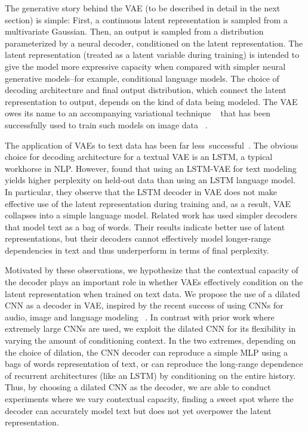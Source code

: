\documentclass{article}
\begin{document}
The generative story behind the VAE (to be described in detail in the next section)
is simple: First, a continuous latent representation is sampled from a multivariate Gaussian. Then, an output is sampled from a distribution parameterized by a neural decoder, conditioned on the
latent representation. The latent representation (treated as a latent variable during training) is intended to give the model more expressive capacity when compared with simpler
neural generative models--for example, conditional language models. The choice of decoding architecture and final output distribution, which connect the latent representation to output, depends on the kind of data being modeled. The VAE owes its name to an accompanying variational technique ~\cite{kingma2013auto} that has been successfully used to train such models on image data ~\cite{gregor2015draw,salimans2015markov,yan2016attribute2image}.


The application of VAEs to text data has been far less\ successful~\cite{bowman2015generating,miao2016neural}. The obvious choice for decoding architecture for a textual VAE is an LSTM, a typical workhorse in NLP. However, \citet{bowman2015generating} found that using an LSTM-VAE for text modeling yields higher perplexity on held-out data than using an LSTM language model. In particular, they observe that the LSTM decoder in VAE does not make effective use of the latent representation during training and, as a result, VAE collapses into a simple language model.
Related work \citep{miao2016neural,larochelle2012neural,mnih2014neural} has used simpler decoders that model text as a bag of words. Their results indicate better use of latent representations, but their decoders cannot effectively model longer-range dependencies in text and thus underperform in terms of final perplexity.

Motivated by these observations, we hypothesize that the contextual capacity of the decoder plays an important role in whether VAEs effectively condition on the latent representation when trained on text data. We propose the use of a dilated CNN as a decoder in VAE, inspired by the recent
success of using CNNs for audio, image and language modeling
~\cite{van2016wavenet, kalchbrenner2016neural, van2016conditional}. In contrast with prior work where extremely large CNNs are used, we exploit the dilated CNN for its flexibility in varying the amount of conditioning context.
In the two extremes, depending on the choice of dilation, the CNN decoder can reproduce a simple MLP using a bags of words representation of text, or can reproduce the long-range dependence of recurrent architectures (like an LSTM) by conditioning on the entire history. Thus, by choosing a dilated CNN as the decoder, we are able to conduct experiments where we vary contextual capacity, finding a sweet spot where the decoder can accurately model text but does not yet overpower the latent representation.
\end{document}
